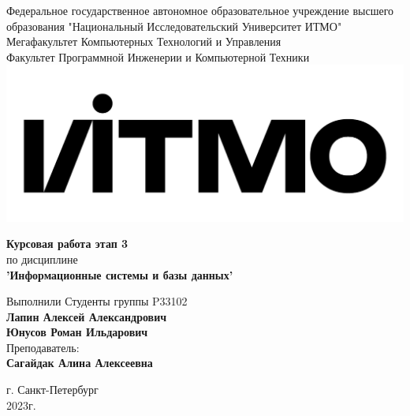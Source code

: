\documentclass[12pt,onecolumn]{article}
\begin{document}
\setcounter{tocdepth}{4}
\begin{center}
    Федеральное государственное автономное образовательное учреждение высшего образования "Национальный Исследовательский Университет ИТМО"\\ 
    Мегафакультет Компьютерных Технологий и Управления\\
    Факультет Программной Инженерии и Компьютерной Техники \\
    \includegraphics[scale=0.3]{image/itmo.jpg} %
\end{center}
\vspace{1cm}


\begin{center}
    \textbf{Курсовая работа этап 3}\\
    по дисциплине\\
    \textbf{'Информационные системы и базы данных'}\\
\end{center}

\vspace{2cm}

\begin{flushright}
  Выполнили Студенты  группы P33102\\
  \textbf{Лапин Алексей Александрович}\\
  \textbf{Юнусов Роман Ильдарович}\\
  Преподаватель: \\
  \textbf{Сагайдак Алина Алексеевна}\\
\end{flushright}

\vspace{6cm}
\begin{center}
    г. Санкт-Петербург\\
    2023г.
\end{center}

\newpage
\tableofcontents
\newpage
\end{document}
